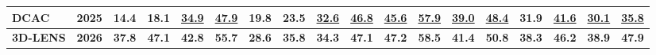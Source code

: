 \documentclass[border=4pt]{standalone}
\begin{document}
\begin{tabular}{l c cccccccc cccc cccc}
DCAC & 2025 & 14.4 & 18.1 & \underline{34.9} & \underline{47.9} & 19.8 & 23.5 & \underline{32.6} & \underline{46.8} & \underline{45.6} & \underline{57.9} & \underline{39.0} & \underline{48.4} & 31.9 & \underline{41.6} & \underline{30.1} & \underline{35.8} \\
\midrule
\textbf{3D-LENS} & \textbf{2026} & \textbf{37.8} & \textbf{47.1} & \textbf{42.8} & \textbf{55.7} & \textbf{28.6} & \textbf{35.8} & \textbf{34.3} & \textbf{47.1} & \textbf{47.2} & \textbf{58.5} & \textbf{41.4} & \textbf{50.8} & \textbf{38.3} & \textbf{46.2} & \textbf{38.9} & \textbf{47.9} \\
\bottomrule
\end{tabular}
\end{document}
